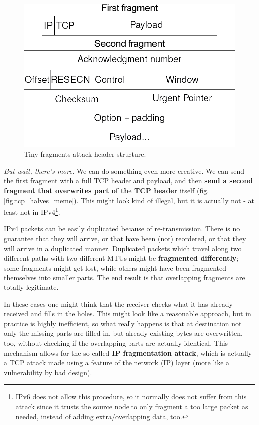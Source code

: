\begin{figure}[h]
    \centering
    \includegraphics[scale=0.4]{img/tiny_fragments_attack.png}
    \decoRule
    \caption{Tiny fragments attack header structure.}
    \label{fig:tiny_fragments_attack}
\end{figure}

\textit{But wait, there's more.} We can do something even more creative. We can send the first fragment with a full TCP header and payload, and then \textbf{send a second fragment that overwrites part of the TCP header} itself (fig. \ref{fig:tcp_halves_meme}). This might look kind of illegal, but it is actually not - at least not in IPv4\footnote{IPv6 does not allow this procedure, so it normally does not suffer from this attack since it trusts the source node to only fragment a too large packet as needed, instead of adding extra/overlapping data, too.}.

IPv4 packets can be easily duplicated because of re-transmission. There is no guarantee that they will arrive, or that have been (not) reordered, or that they will arrive in a duplicated manner. Duplicated packets which travel along two different paths with two different MTUs might be \textbf{fragmented differently}; some fragments might get lost, while others might have been fragmented themselves into smaller parts. The end result is that overlapping fragments are totally legitimate.

In these cases one might think that the receiver checks what it has already received and fills in the holes. This might look like a reasonable approach, but in practice is highly inefficient, so what really happens is that at destination not only the missing parts are filled in, but already existing bytes are overwritten, too, without checking if the overlapping parts are actually identical. This mechanism allows for the so-called \textbf{IP fragmentation attack}, which is actually a TCP attack made using a feature of the network (IP) layer (more like a vulnerability by bad design).

